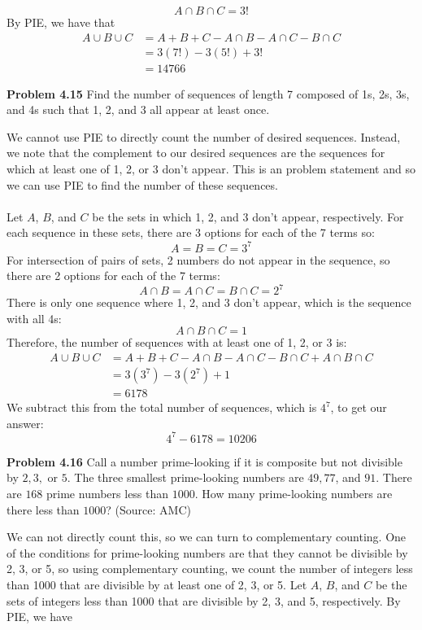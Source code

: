 \documentclass[11pt]{scrartcl}
\begin{document}
$${A \cap B \cap C}=3!$$
By PIE, we have that 
\begin{align*}
    {A \cup B \cup C} &={A}+{B}+{C}-{A \cap B}-{A \cap C}-{B \cap C} \\
                      &= 3(7!)-3(5!)+3! \\
                      &= 14766
\end{align*}
\begin{tcolorbox}
\textbf{Problem 4.15} Find the number of sequences of length 7 composed of 1s, 2s, 3s, and 4s such that 1, 2, and 3 all appear at least once.  
\end{tcolorbox}
 We cannot use PIE to directly count the number of desired sequences. Instead, we note that the complement to our desired sequences are the sequences for which at least one of 1, 2, or 3 don't appear. This is an  problem statement and so we can use PIE to find the number of these sequences. \\
\\
\noindent 
Let $A$, $B$, and $C$ be the sets in which 1, 2, and 3 don't appear, respectively. For each sequence in these sets, there are 3 options for each of the 7 terms so: 
$$A=B=C=3^7$$
For intersection of pairs of sets, 2 numbers do not appear in the sequence, so there are 2 options for each of the 7 terms: 
$${A \cap B}={A \cap C}={B \cap C}=2^7$$
There is only one sequence where 1, 2, and 3 don't appear, which is the sequence with all 4s: 
$${A \cap B \cap C}=1$$
Therefore, the number of sequences with at least one of 1, 2, or 3 is: 
\begin{align*}
    {A \cup B \cup C} &={A}+{B}+{C}-{A \cap B}-{A \cap C}-{B \cap C}+{A \cap B \cap C} \\
                      &=3(3^7)-3(2^7)+1 \\
                      &=6178
\end{align*}
We subtract this from the total number of sequences, which is $4^7$, to get our answer: 
$$4^7-6178=10206$$
\begin{tcolorbox}
\textbf{Problem 4.16} Call a number prime-looking if it is composite but not divisible by $2, 3,$ or $5.$ The three smallest prime-looking numbers are $49, 77$, and $91$. There are $168$ prime numbers less than $1000$. How many prime-looking numbers are there less than $1000$? (Source: AMC)
\end{tcolorbox}
\noindent 
We can not directly count this, so we can turn to complementary counting. One of the conditions for prime-looking numbers are that they cannot be divisible by 2, 3, or 5, so using complementary counting, we count the number of integers less than 1000 that are divisible by at least one of 2, 3, or 5. Let $A$, $B$, and $C$ be the sets of integers less than 1000 that are divisible by 2, 3, and 5, respectively. By PIE, we have 
\end{document}
